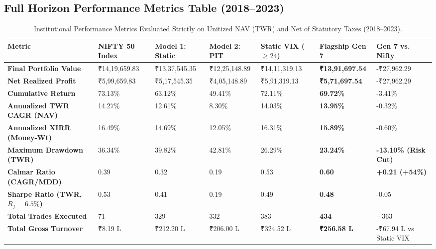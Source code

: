 \documentclass[11pt,a4paper]{article}
\begin{document}
\subsection{Full Horizon Performance Metrics Table (2018--2023)}
\begin{table}[H]
\centering
\scriptsize
\begin{tabularx}{\textwidth}{lXXXXXX}
\toprule
\textbf{Metric} & \textbf{NIFTY 50 Index} & \textbf{Model 1: Static} & \textbf{Model 2: PIT} & \textbf{Static VIX ($\ge 24$)} & \textbf{Flagship Gen 7} & \textbf{Gen 7 vs. Nifty} \\
\midrule
\textbf{Final Portfolio Value} & ₹14,19,659.83 & ₹13,37,545.35 & ₹12,25,148.89 & ₹14,11,319.13 & \textbf{₹13,91,697.54} & -₹27,962.29 \\
\textbf{Net Realized Profit} & ₹5,99,659.83 & ₹5,17,545.35 & ₹4,05,148.89 & ₹5,91,319.13 & \textbf{₹5,71,697.54} & -₹27,962.29 \\
\textbf{Cumulative Return} & 73.13\% & 63.12\% & 49.41\% & 72.11\% & \textbf{69.72\%} & -3.41\% \\
\textbf{Annualized TWR CAGR (NAV)} & 14.27\% & 12.61\% & 8.30\% & 14.03\% & \textbf{13.95\%} & -0.32\% \\
\textbf{Annualized XIRR (Money-Wt)} & 16.49\% & 14.69\% & 12.05\% & 16.31\% & \textbf{15.89\%} & -0.60\% \\
\textbf{Maximum Drawdown (TWR)} & 36.34\% & 39.82\% & 42.81\% & 26.29\% & \textbf{23.24\%} & \textbf{-13.10\% (Risk Cut)} \\
\textbf{Calmar Ratio (CAGR/MDD)} & 0.39 & 0.32 & 0.19 & 0.53 & \textbf{0.60} & \textbf{+0.21 (+54\%)} \\
\textbf{Sharpe Ratio (TWR, $R_f=6.5\%$)} & 0.53 & 0.41 & 0.19 & 0.49 & \textbf{0.48} & -0.05 \\
\textbf{Total Trades Executed} & 71 & 329 & 332 & 383 & \textbf{434} & +363 \\
\textbf{Total Gross Turnover} & ₹8.19 L & ₹212.20 L & ₹206.00 L & ₹324.52 L & \textbf{₹256.58 L} & -₹67.94 L vs Static VIX \\
\bottomrule
\end{tabularx}
\caption{Institutional Performance Metrics Evaluated Strictly on Unitized NAV (TWR) and Net of Statutory Taxes (2018--2023).}
\end{table}
\end{document}
